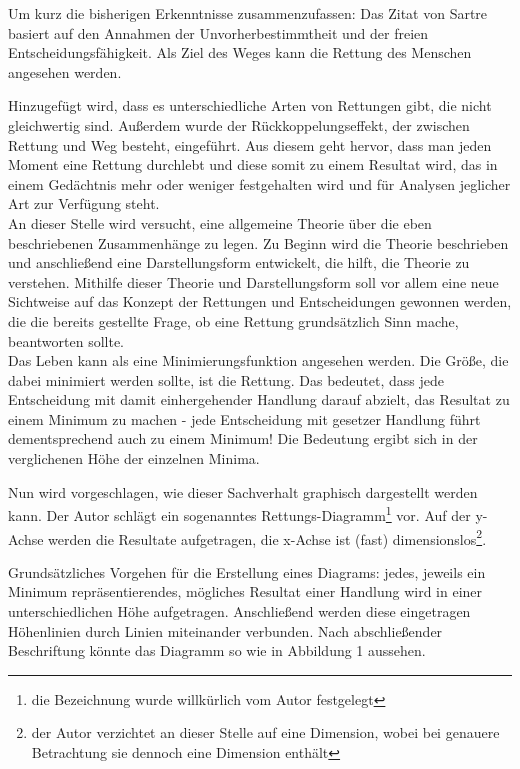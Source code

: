 \documentclass[12pt,a4paper,oneside]{article}
\begin{document}
  Um kurz die bisherigen Erkenntnisse zusammenzufassen: Das Zitat von Sartre basiert auf den Annahmen der Unvorherbestimmtheit und der freien Entscheidungsfähigkeit. Als Ziel des Weges kann die Rettung des Menschen angesehen werden. 
  
  Hinzugefügt wird, dass es unterschiedliche Arten von Rettungen gibt, die nicht gleichwertig sind. Außerdem wurde der Rückkoppelungseffekt, der zwischen Rettung und Weg besteht, eingeführt. Aus diesem geht hervor, dass man jeden Moment eine Rettung durchlebt und diese somit zu einem Resultat wird, das in einem Gedächtnis mehr oder weniger festgehalten wird und für Analysen jeglicher Art zur Verfügung steht. \\
  
  An dieser Stelle wird versucht, eine allgemeine Theorie über die eben beschriebenen Zusammenhänge zu legen. Zu Beginn wird die Theorie beschrieben und anschließend eine Darstellungsform entwickelt, die hilft, die Theorie zu verstehen. Mithilfe dieser Theorie und Darstellungsform soll vor allem eine neue Sichtweise auf das Konzept der Rettungen und Entscheidungen gewonnen werden, die die bereits gestellte Frage, ob eine Rettung grundsätzlich Sinn mache, beantworten sollte. \\
  
  Das Leben kann als eine Minimierungsfunktion angesehen werden. Die Größe, die dabei minimiert werden sollte, ist die Rettung. Das bedeutet, dass jede Entscheidung mit damit einhergehender Handlung darauf abzielt, das Resultat zu einem Minimum zu machen - jede Entscheidung mit gesetzer Handlung führt dementsprechend auch zu einem Minimum! Die Bedeutung ergibt sich in der verglichenen Höhe der einzelnen Minima. 
  
  Nun wird vorgeschlagen, wie dieser Sachverhalt graphisch dargestellt werden kann. Der Autor schlägt ein sogenanntes Rettungs-Diagramm\footnote{die Bezeichnung wurde willkürlich vom Autor festgelegt} vor. Auf der y-Achse werden die Resultate aufgetragen, die x-Achse ist (fast) dimensionslos\footnote{der Autor verzichtet an dieser Stelle auf eine Dimension, wobei bei genauere Betrachtung sie dennoch eine Dimension enthält}.
  
  Grundsätzliches Vorgehen für die Erstellung eines Diagrams: jedes, jeweils ein Minimum repräsentierendes, mögliches Resultat einer Handlung wird in einer unterschiedlichen Höhe aufgetragen. Anschließend werden diese eingetragen Höhenlinien durch Linien miteinander verbunden. Nach abschließender Beschriftung könnte das Diagramm so wie in Abbildung 1 aussehen. \\
  
\end{document}
